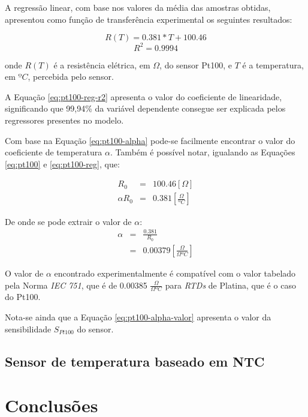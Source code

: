 \documentclass[a4paper]{instrumentacao}
\begin{document}
A regressão linear, com base nos valores da média das amostras obtidas, apresentou como função de transferência experimental os seguintes resultados:

\begin{equation}
	R(T) = 0.381*T + 100.46
	\label{eq:pt100-reg}
\end{equation}
\begin{equation}
	R^2=0.9994
	\label{eq:pt100-reg-r2}
\end{equation}

\noindent
onde $R(T)$ é a resistência elétrica, em $\Omega$, do sensor Pt100, e $T$ é a temperatura, em $ºC$, percebida pelo sensor.

A Equação \ref{eq:pt100-reg-r2} apresenta o valor do coeficiente de linearidade, significando que 99,94\% da variável dependente consegue ser explicada pelos regressores presentes no modelo.

Com base na Equação \ref{eq:pt100-alpha} pode-se facilmente encontrar o valor do coeficiente de temperatura $\alpha$. Também é possível notar, igualando as Equações \ref{eq:pt100} e \ref{eq:pt100-reg}, que:

\begin{eqnarray}
	R_0 &=& 100.46 [\Omega]\\
	\alpha R_0 &=& 0.381 [\frac{\Omega}{ºC}] \label{eq:pt100-alpha-valor}
\end{eqnarray}

De onde se pode extrair o valor de $\alpha$:
\begin{eqnarray}
	\alpha &=& \frac{0.381}{R_0} \\
	       &=& 0.00379 [\frac{\Omega}{\Omega ºC}]
\end{eqnarray}

O valor de $\alpha$ encontrado experimentalmente é compatível com o valor tabelado pela Norma \textit{IEC 751}, que é de 0.00385 $\frac{\Omega}{\Omega ºC}$ para \textit{RTDs} de Platina, que é o caso do Pt100.

Nota-se ainda que a Equação \ref{eq:pt100-alpha-valor} apresenta o valor da sensibilidade $S_{Pt100}$ do sensor.

\section{Sensor de temperatura baseado em NTC}

\chapter{Conclusões}
\end{document}
